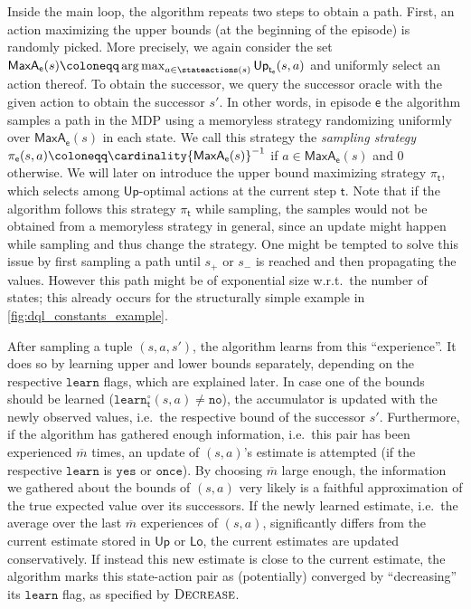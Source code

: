 \documentclass{theoretics}
\DeclareMathOperator*{\argmax}{arg\,max}
\newcommand{\strategy}{\pi}
\newcommand{\upperbound}{\mathsf{Up}}
\newcommand{\lowerbound}{\mathsf{Lo}}
\newcommand{\targetstate}{s_+}
\newcommand{\sinkstate}{s_-}
\newcommand{\delay}{{\overline{m}}}
\newcommand{\learn}{\texttt{learn}}
\newcommand{\learnyes}{\texttt{yes}}
\newcommand{\learnonce}{\texttt{once}}
\newcommand{\learnno}{\texttt{no}}
\newcommand{\learndecrease}{\textsc{Decrease}}
\newcommand{\algostep}{\mathsf{t}}
\newcommand{\algoepisode}{\mathsf{e}}
\newcommand{\umaxactions}{\mathsf{MaxA}}
\begin{document}
Inside the main loop, the algorithm repeats two steps to obtain a path.
First, an action maximizing the upper bounds (at the beginning of the episode) is randomly picked.
More precisely, we again consider the set $\umaxactions_\algoepisode(s) \coloneqq \argmax_{a \in \stateactions(s)} \upperbound_{\algostep_\algoepisode}(s, a)$ and uniformly select an action thereof.
To obtain the successor, we query the successor oracle with the given action to obtain the successor $s'$.
In other words, in episode $\algoepisode$ the algorithm samples a path in the MDP using a memoryless strategy randomizing uniformly over $\umaxactions_\algoepisode(s)$ in each state.
We call this strategy the \emph{sampling strategy} $\strategy_\algoepisode(s, a) \coloneqq \cardinality{\umaxactions_\algoepisode(s)}^{-1}$ if $a \in \umaxactions_\algoepisode(s)$ and $0$ otherwise.
We will later on introduce the upper bound maximizing strategy $\strategy_\algostep$, which selects among $\upperbound$-optimal actions at the current step $\algostep$.
Note that if the algorithm follows this strategy $\strategy_\algostep$ while sampling, the samples would not be obtained from a memoryless strategy in general, since an update might happen while sampling and thus change the strategy.
One might be tempted to solve this issue by first sampling a path until $\targetstate$ or $\sinkstate$ is reached and then propagating the values.
However this path might be of exponential size w.r.t.\ the number of states; this already occurs for the structurally simple example in \cref{fig:dql_constants_example}.

After sampling a tuple $(s, a, s')$, the algorithm learns from this \enquote{experience}.
It does so by learning upper and lower bounds separately, depending on the respective $\learn$ flags, which are explained later.
In case one of the bounds should be learned ($\learn^\circ_\algostep(s, a) \neq \learnno$), the accumulator is updated with the newly observed values, i.e.\ the respective bound of the successor $s'$.
Furthermore, if the algorithm has gathered enough information, i.e.\ this pair has been experienced $\delay$ times, an update of $(s, a)$'s estimate is attempted (if the respective $\learn$ is $\learnyes$ or $\learnonce$).
By choosing $\delay$ large enough, the information we gathered about the bounds of $(s, a)$ very likely is a faithful approximation of the true expected value over its successors.
If the newly learned estimate, i.e.\ the average over the last $\delay$ experiences of $(s, a)$, significantly differs from the current estimate stored in $\upperbound$ or $\lowerbound$, the current estimates are updated conservatively.
If instead this new estimate is close to the current estimate, the algorithm marks this state-action pair as (potentially) converged by \enquote{decreasing} its $\learn$ flag, as specified by $\learndecrease$.
\end{document}

